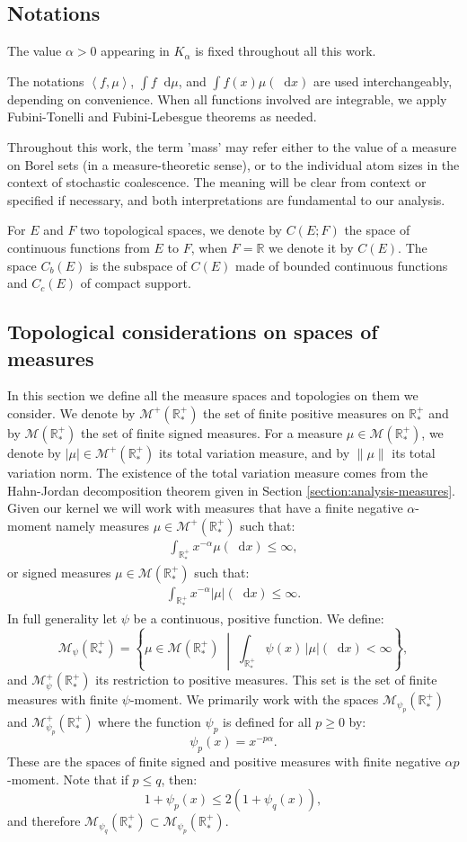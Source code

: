 \documentclass[11pt,a4paper]{article}
\newcommand{\RR}{\mathbb{R}}
\newcommand{\RRP}{\mathbb{R}^+_*}
\newcommand{\MC}{\mathcal{M}}
\newcommand{\brac}[1]{\left\langle#1\right\rangle}
\newcommand{\dd}{\mathop{}\!\mathrm{d}}
\begin{document}
\subsection{Notations}
The value $\alpha > 0$ appearing in $K_\alpha$ is fixed throughout all this work. 

The notations $\brac{f,\mu}$, $\int f \dd \mu$, and $\int f(x)\mu(\dd x)$ are used interchangeably, depending on convenience. When all functions involved are integrable, we apply Fubini-Tonelli and Fubini-Lebesgue theorems as needed.

Throughout this work, the term 'mass' may refer either to the value of a measure on Borel sets (in a measure-theoretic sense), or to the individual atom sizes in the context of stochastic coalescence. The meaning will be clear from context or specified if necessary, and both interpretations are fundamental to our analysis.

For $E$ and $F$ two topological spaces, we denote by $C(E;F)$ the space of continuous functions from $E$ to $F$, when $F = \RR$ we denote it by $C(E)$. The space $C_b(E)$ is the subspace of $C(E)$ made of bounded continuous functions and $C_c(E)$ of compact support. 

\subsection{Topological considerations on spaces of measures}

In this section we define all the measure spaces and topologies on them we consider. We denote by $\MC^+(\RRP)$ the set of finite positive measures on $\RRP$ and by $\MC(\RRP)$ the set of finite signed measures. For a measure $\mu \in \MC(\RRP)$, we denote by $|\mu| \in \MC^+(\RRP)$ its total variation measure, and by $\|\mu\|$ its total variation norm. The existence of the total variation measure comes from the Hahn-Jordan decomposition theorem given in Section \ref{section:analysis-measures}. Given our kernel we will work with measures that have a finite negative $\alpha$-moment namely measures $\mu \in  \MC^+(\RRP)$ such that:
\begin{align*}
    \int_{\RRP} x^{-\alpha} \mu(\dd x) \leq  \infty,
\end{align*}
or signed measures $\mu \in  \MC(\RRP)$ such that:
\begin{align*}
    \int_{\RRP} x^{-\alpha} |\mu|(\dd x) \leq  \infty.
\end{align*}
In full generality let $\psi$ be a continuous, positive function. We define:
\[
\MC_{\psi}(\RRP) = \left\lbrace \mu \in \MC(\RRP) \;\middle|\; \int_{\RRP} \psi(x)\,|\mu|(\dd x) < \infty \right\rbrace,
\]
and $\MC^+_{\psi}(\RRP)$ its restriction to positive measures. This set is the set of finite measures with finite $\psi$-moment. We primarily work with the spaces $\MC_{\psi_p}(\RRP)$ and $\MC^+_{\psi_p}(\RRP)$ where the function $\psi_p$ is defined for all $p \geq 0$ by:
\[
\psi_p(x) = x^{-p\alpha}.
\]
These are the spaces of finite signed and positive measures with finite negative $\alpha p$-moment. Note that if $p \leq q$, then:
\[
1 + \psi_p(x) \leq 2(1 + \psi_q(x)),
\]
and therefore $\MC_{\psi_q}(\RRP) \subset \MC_{\psi_p}(\RRP)$. 
\end{document}
